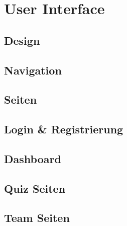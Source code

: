 \section{User Interface}

\subsection{Design}

\subsection{Navigation}

\subsection{Seiten}

\subsection*{Login \& Registrierung}

\subsection*{Dashboard}

\subsection*{Quiz Seiten}

\subsection*{Team Seiten}
